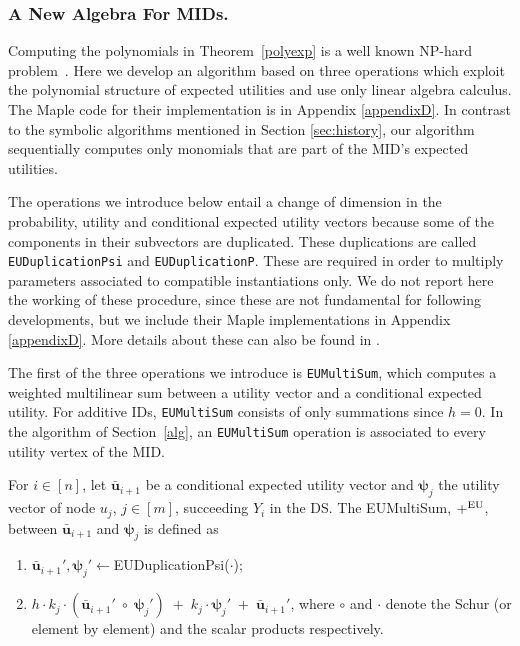 \subsubsection{A New Algebra For MIDs.}
\label{op}
Computing the polynomials in Theorem~\ref{polyexp} is a well known  NP-hard problem~\citep{Cooper1990}. 
Here we develop an algorithm based on three operations which exploit the polynomial structure of expected utilities and use only linear algebra calculus.  The Maple code for their implementation is  in Appendix \ref{appendixD}. In contrast to the symbolic algorithms mentioned in Section \ref{sec:history}, our algorithm sequentially computes only monomials that  are part of the MID's expected utilities.
 
The operations we introduce below entail a change of dimension in the probability, utility and conditional expected utility vectors because some of the components in their subvectors are duplicated. These duplications are called \texttt{EUDuplicationPsi} and \texttt{EUDuplicationP}.  These are required in order to multiply parameters associated to compatible instantiations only. We do not report here the working of these procedure, since these are not fundamental for  following developments, but we include their Maple implementations in Appendix \ref{appendixD}. More details about these can also be found in \citet{Leonelli2015a}.  

The first of the three operations we introduce is \texttt{EUMultiSum}, which computes a weighted multilinear sum between a utility vector and a conditional expected utility.
For additive IDs, \texttt{EUMultiSum} consists of only summations since $h=0$.
In the algorithm of Section~\ref{alg}, an \texttt{EUMultiSum} operation is associated to every utility vertex of the MID. 

\begin{definition}[EUMultiSum]
\label{EUMultiSum}
For $i\in [n]$, let $\bar{\bm{u}}_{i+1}$ be a conditional expected utility vector and $\bm{\psi}_j$ the utility vector of node $u_j$, $j\in [m]$, succeeding $Y_i$ in the DS. The EUMultiSum, $+^{\textnormal{EU}}$, between $\bar{\bm{u}}_{i+1}$ and $\bm{\psi}_j$ is defined as
\begin{enumerate}
\item $\bar{\bm{u}}_{i+1}',\bm{\psi}_j'\longleftarrow$EUDuplicationPsi($\cdot$);
\item$h\cdot k_j\cdot(\bar{\bm{u}}_{i+1}'\;\circ\;\bm{\psi}_j')\;+\;k_j\cdot\bm{\psi}_j'\;+\;\bar{\bm{u}}_{i+1}'$, where $\circ$ and  $\cdot$ denote the Schur (or element by element) and the scalar products  respectively.
\end{enumerate}
\end{definition}

